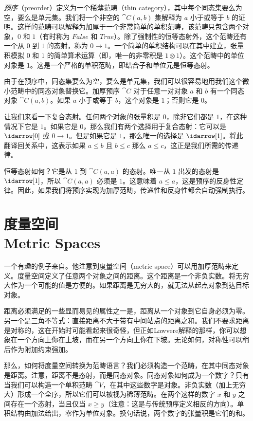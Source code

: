 \emph{预序}（preorder）定义为一个稀薄范畴（thin category），其中每个同态集要么为空，要么是单元集。我们将一个非空的 $\cat{C}(a, b)$ 集解释为 $a$ 小于或等于 $b$ 的证明。这样的范畴可以解释为加厚于一个非常简单的单积范畴，该范畴只包含两个对象，$0$ 和 $1$（有时称为 $\mathit{False}$ 和 $\mathit{True}$）。除了强制性的恒等态射外，这个范畴还有一个从 $0$ 到 $1$ 的态射，称为 $0 \to 1$。一个简单的单积结构可以在其中建立，张量积模拟 $0$ 和 $1$ 的简单算术运算（即，唯一的非零积是 $1 \otimes 1$）。这个范畴中的单位对象是 $1$。这是一个严格的单积范畴，即结合子和单位元是恒等态射。

由于在预序中，同态集要么为空，要么是单元集，我们可以很容易地用我们这个微小范畴中的同态对象替换它。加厚预序 $\cat{C}$ 对于任意一对对象 $a$ 和 $b$ 有一个同态对象 $\cat{C}(a, b)$。如果 $a$ 小于或等于 $b$，这个对象是 $1$；否则它是 $0$。

让我们来看一下复合态射。任何两个对象的张量积是 $0$，除非它们都是 $1$，在这种情况下它是 $1$。如果它是 $0$，那么我们有两个选择用于复合态射：它可以是 $\idarrow[0]$ 或 $0 \to 1$。但是如果它是 $1$，那么唯一的选择是 $\idarrow[1]$。将此翻译回关系中，这表示如果 $a \leqslant b$ 且 $b \leqslant c$ 那么 $a \leqslant c$，这正是我们所需的传递律。

恒等态射如何？它是从 $1$ 到 $\cat{C}(a, a)$ 的态射。唯一从 $1$ 出发的态射是 $\idarrow[1]$，所以 $\cat{C}(a, a)$ 必须是 $1$。这意味着 $a \leqslant a$，这是预序的反身性定律。因此，如果我们将预序实现为加厚范畴，传递性和反身性都会自动强制执行。

\section{度量空间\\ \textmd{Metric Spaces}}

一个有趣的例子来自。他注意到度量空间（metric space）可以用加厚范畴来定义。度量空间定义了任意两个对象之间的距离。这个距离是一个非负实数。将无穷大作为一个可能的值是方便的。如果距离是无穷大的，就无法从起点对象到达目标对象。

距离必须满足的一些显而易见的属性之一是，距离从一个对象到它自身必须为零。另一个是三角不等式：直接距离不大于带有中间站点的距离之和。我们不要求距离是对称的，这在开始时可能看起来很奇怪，但正如Lawvere解释的那样，你可以想象在一个方向上你在上坡，而在另一个方向上你在下坡。无论如何，对称性可以稍后作为附加约束强加。

那么，如何将度量空间转换为范畴语言？我们必须构造一个范畴，在其中同态对象是距离。注意，距离不是态射，而是同态对象。同态对象如何成为一个数字？只有当我们可以构造一个单积范畴 $\cat{V}$，在其中这些数字是对象。非负实数（加上无穷大）形成一个全序，所以它们可以被视为稀薄范畴。在两个这样的数字 $x$ 和 $y$ 之间存在一个态射，当且仅当 $x \geqslant y$（注意：这是与传统预序定义相反的方向）。单积结构由加法给出，零作为单位对象。换句话说，两个数字的张量积是它们的和。

